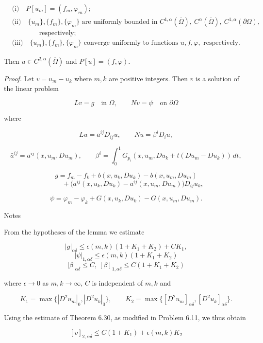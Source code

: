 \[
\begin{aligned}
&\text{(i)}\quad P[u_m] = (f_m, \varphi_m);\\
&\text{(ii)}\quad \{u_m\}, \{f_m\}, \{\varphi_m\} \text{ are uniformly bounded in } C^{1,\alpha}(\overline{\Omega}),\ C^\alpha(\overline{\Omega}),\ C^{1,\alpha}(\partial\Omega),\\
&\qquad\qquad\text{respectively;}\\
&\text{(iii)}\quad \{u_m\}, \{f_m\}, \{\varphi_m\} \text{ converge uniformly to functions } u, f, \varphi, \text{ respectively.}
\end{aligned}
\]

Then $u \in C^{2,\alpha}(\overline{\Omega})$ and $P[u] = (f, \varphi)$.

\textit{Proof.} \quad Let $v = u_m - u_k$ where $m, k$ are positive integers. Then $v$ is a solution of the
linear problem

\[
Lv = g \quad \text{in } \Omega, \qquad Nv = \psi \quad \text{on } \partial\Omega
\]

where

\[
Lu = \bar{a}^{ij}D_{ij}u,\qquad Nu = \beta^i D_i u,
\]

\[
\bar{a}^{ij} = a^{ij}(x, u_m, Du_m), \qquad \beta^i = \int_0^1 G_{p_i}(x, u_m, Du_k + t(Du_m - Du_k))\,dt,
\]

\[
g = f_m - f_k + b(x, u_k, Du_k) - b(x, u_m, Du_m)
\]
\[
\qquad + \bigl(a^{ij}(x, u_k, Du_k) - a^{ij}(x, u_m, Du_m)\bigr)D_{ij}u_k,
\]

\[
\psi = \varphi_m - \varphi_k + G(x, u_k, Du_k) - G(x, u_m, Du_m).
\]


Notes

From the hypotheses of the lemma we estimate

\[
|g|_{\alpha\delta} \le \epsilon(m,k)(1 + K_1 + K_2) + CK_1,
\]
\[
|\psi|_{1,\alpha\delta} \le \epsilon(m,k)(1 + K_1 + K_2)
\]
\[
|\beta|_{\alpha\delta} \le C,\ [\beta]_{1,\alpha\delta} \le C(1 + K_1 + K_2)
\]

where $\epsilon \to 0$ as $m,k \to \infty$, $C$ is independent of $m,k$ and

\[
K_1 = \max \{ |D^2u_m|_{0}, |D^2u_k|_{0} \}, \qquad
K_2 = \max \{ [D^2u_m]_{\alpha\delta}, [D^2u_k]_{\alpha\delta} \}.
\]

Using the estimate of Theorem 6.30, as modified in Problem 6.11, we thus obtain

\[
[v]_{2,\alpha\delta} \le C(1 + K_1) + \epsilon(m,k)K_2
\]

